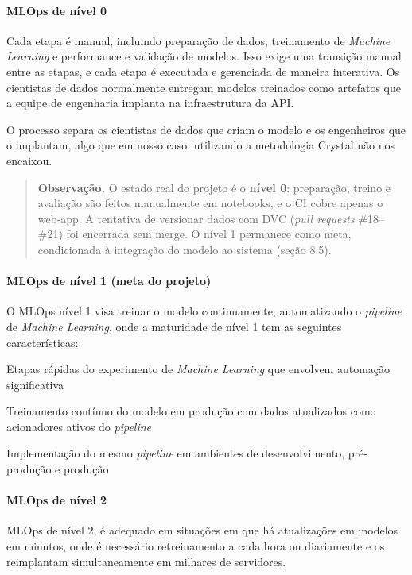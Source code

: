 \documentclass[
  brazilian,
  11pt,
]{article}
\begin{document}
\paragraph{MLOps de nível 0}\label{mlops-de-nuxedvel-0}

Cada etapa é manual, incluindo preparação de dados, treinamento de \emph{Machine Learning} e performance e validação de modelos. Isso exige uma transição manual entre as etapas, e cada etapa é executada e gerenciada de maneira interativa. Os cientistas de dados normalmente entregam modelos treinados como artefatos que a equipe de engenharia implanta na infraestrutura da API.

O processo separa os cientistas de dados que criam o modelo e os engenheiros que o implantam, algo que em nosso caso, utilizando a metodologia Crystal não nos encaixou.

\begin{quote}
\textbf{Observação.} O estado real do projeto é o \textbf{nível 0}: preparação, treino e avaliação são feitos manualmente em notebooks, e o CI cobre apenas o web-app. A tentativa de versionar dados com DVC (\emph{pull requests} \#18--\#21) foi encerrada sem merge. O nível 1 permanece como meta, condicionada à integração do modelo ao sistema (seção 8.5).
\end{quote}

\paragraph{MLOps de nível 1 (meta do projeto)}\label{mlops-de-nuxedvel-1-meta-do-projeto}

O MLOps nível 1 visa treinar o modelo continuamente, automatizando o \emph{pipeline} de \emph{Machine Learning}, onde a maturidade de nível 1 tem as seguintes características:

Etapas rápidas do experimento de \emph{Machine Learning} que envolvem automação significativa

Treinamento contínuo do modelo em produção com dados atualizados como acionadores ativos do \emph{pipeline}

Implementação do mesmo \emph{pipeline} em ambientes de desenvolvimento, pré-produção e produção

\paragraph{MLOps de nível 2}\label{mlops-de-nuxedvel-2}

MLOps de nível 2, é adequado em situações em que há atualizações em modelos em minutos, onde é necessário retreinamento a cada hora ou diariamente e os reimplantam simultaneamente em milhares de servidores.
\end{document}
